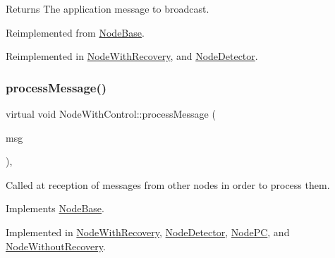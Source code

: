 \begin{DoxyReturn}{Returns}
The application message to broadcast. 
\end{DoxyReturn}


Reimplemented from \hyperlink{class_node_base_a66c1dee9d15119bc3e68da71067ff6cd}{Node\+Base}.



Reimplemented in \hyperlink{class_node_with_recovery_a33d8e8775fd69cb647b38a54b36e1ebe}{Node\+With\+Recovery}, and \hyperlink{class_node_detector_af75cf37cc01fc51bc228a7a83c10cb97}{Node\+Detector}.

\mbox{\label{class_node_with_control_af532082fab76c38d8c50ca90e991f4c3}} 
\subsubsection{\texorpdfstring{process\+Message()}{processMessage()}}
{\footnotesize\ttfamily virtual void Node\+With\+Control\+::process\+Message (\begin{DoxyParamCaption}\item[{c\+Message $\ast$}]{msg }\end{DoxyParamCaption})\hspace{0.3cm}{\ttfamily [protected]}, {}}



Called at reception of messages from other nodes in order to process them. 



Implements \hyperlink{class_node_base_ae70b168f2bc7407c249594b1c614301c}{Node\+Base}.



Implemented in \hyperlink{class_node_with_recovery_a216c29d76ddb0e94cd5701ff208c7f5b}{Node\+With\+Recovery}, \hyperlink{class_node_detector_ab69432c6d3327a684845ec231826727e}{Node\+Detector}, \hyperlink{class_node_p_c_aa5fedc4136104a06e2f1131f1ba16b0e}{Node\+PC}, and \hyperlink{class_node_without_recovery_a0b44132b4ebc650399711766cb050399}{Node\+Without\+Recovery}.

\mbox{\label{class_node_with_control_ae177f5f64edcc09a3875e5afdc82edd2}} 
